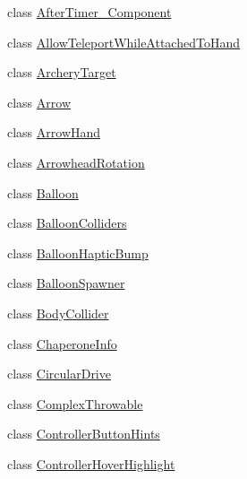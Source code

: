 \begin{DoxyCompactItemize}
\item 
class \mbox{\hyperlink{class_valve_1_1_v_r_1_1_interaction_system_1_1_after_timer___component}{After\+Timer\+\_\+\+Component}}
\item 
class \mbox{\hyperlink{class_valve_1_1_v_r_1_1_interaction_system_1_1_allow_teleport_while_attached_to_hand}{Allow\+Teleport\+While\+Attached\+To\+Hand}}
\item 
class \mbox{\hyperlink{class_valve_1_1_v_r_1_1_interaction_system_1_1_archery_target}{Archery\+Target}}
\item 
class \mbox{\hyperlink{class_valve_1_1_v_r_1_1_interaction_system_1_1_arrow}{Arrow}}
\item 
class \mbox{\hyperlink{class_valve_1_1_v_r_1_1_interaction_system_1_1_arrow_hand}{Arrow\+Hand}}
\item 
class \mbox{\hyperlink{class_valve_1_1_v_r_1_1_interaction_system_1_1_arrowhead_rotation}{Arrowhead\+Rotation}}
\item 
class \mbox{\hyperlink{class_valve_1_1_v_r_1_1_interaction_system_1_1_balloon}{Balloon}}
\item 
class \mbox{\hyperlink{class_valve_1_1_v_r_1_1_interaction_system_1_1_balloon_colliders}{Balloon\+Colliders}}
\item 
class \mbox{\hyperlink{class_valve_1_1_v_r_1_1_interaction_system_1_1_balloon_haptic_bump}{Balloon\+Haptic\+Bump}}
\item 
class \mbox{\hyperlink{class_valve_1_1_v_r_1_1_interaction_system_1_1_balloon_spawner}{Balloon\+Spawner}}
\item 
class \mbox{\hyperlink{class_valve_1_1_v_r_1_1_interaction_system_1_1_body_collider}{Body\+Collider}}
\item 
class \mbox{\hyperlink{class_valve_1_1_v_r_1_1_interaction_system_1_1_chaperone_info}{Chaperone\+Info}}
\item 
class \mbox{\hyperlink{class_valve_1_1_v_r_1_1_interaction_system_1_1_circular_drive}{Circular\+Drive}}
\item 
class \mbox{\hyperlink{class_valve_1_1_v_r_1_1_interaction_system_1_1_complex_throwable}{Complex\+Throwable}}
\item 
class \mbox{\hyperlink{class_valve_1_1_v_r_1_1_interaction_system_1_1_controller_button_hints}{Controller\+Button\+Hints}}
\item 
class \mbox{\hyperlink{class_valve_1_1_v_r_1_1_interaction_system_1_1_controller_hover_highlight}{Controller\+Hover\+Highlight}}
\item 

\end{DoxyCompactItemize}
